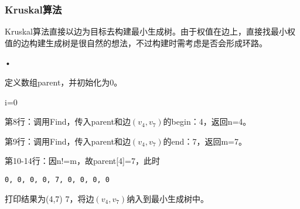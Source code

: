 \subsubsection{\tf Kruskal算法}
\begin{frame}\ft{\subsubsecname}
\tf Kruskal算法直接以边为目标去构建最小生成树。由于权值在边上，直接找最小权值的边构建生成树是很自然的想法，不过构建时需考虑是否会形成环路。
\end{frame}

\begin{frame}\ft{\subsubsecname}
\begin{figure}

\end{figure}•
\end{frame}

\begin{frame}\ft{\subsubsecname}

\end{frame}

\begin{frame}\ft{\subsubsecname}

\end{frame}

\begin{frame}\ft{\subsubsecname}
\tf  
定义数组parent，并初始化为0。
\end{frame}


\begin{frame}[fragile]\ft{\subsubsecname}
\tf i=0
\vspace{0.05in}


第8行：调用Find，传入parent和边$(v_4,v_7)$的begin：4，返回n=4。 \vspace{0.05in}%

第9行：调用Find，传入parent和边$(v_4,v_7)$的end：7，返回m=7。 \vspace{0.05in} %

第10-14行：因n!=m，故parent[4]=7，此时
\begin{lstlisting}[xleftmargin=2em]
0, 0, 0, 0, 7, 0, 0, 0, 0
\end{lstlisting}
打印结果为(4,7) 7，将边$(v_4,v_7)$纳入到最小生成树中。
\end{frame}

